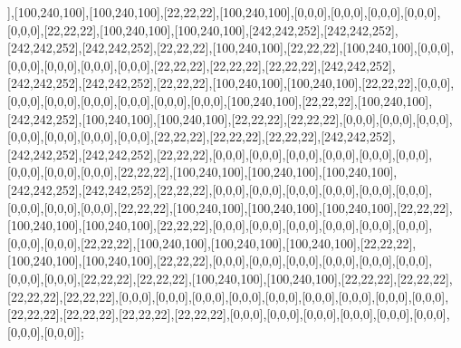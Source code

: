 ],[100,240,100],[100,240,100],[22,22,22],[100,240,100],[0,0,0],[0,0,0],[0,0,0],[0,0,0],[0,0,0],[22,22,22],[100,240,100],[100,240,100],[242,242,252],[242,242,252],[242,242,252],[242,242,252],[22,22,22],[100,240,100],[22,22,22],[100,240,100],[0,0,0],[0,0,0],[0,0,0],[0,0,0],[0,0,0],[22,22,22],[22,22,22],[22,22,22],[242,242,252],[242,242,252],[242,242,252],[22,22,22],[100,240,100],[100,240,100],[22,22,22],[0,0,0],[0,0,0],[0,0,0],[0,0,0],[0,0,0],[0,0,0],[0,0,0],[100,240,100],[22,22,22],[100,240,100],[242,242,252],[100,240,100],[100,240,100],[22,22,22],[22,22,22],[0,0,0],[0,0,0],[0,0,0],[0,0,0],[0,0,0],[0,0,0],[0,0,0],[22,22,22],[22,22,22],[22,22,22],[242,242,252],[242,242,252],[242,242,252],[22,22,22],[0,0,0],[0,0,0],[0,0,0],[0,0,0],[0,0,0],[0,0,0],[0,0,0],[0,0,0],[0,0,0],[22,22,22],[100,240,100],[100,240,100],[100,240,100],[242,242,252],[242,242,252],[22,22,22],[0,0,0],[0,0,0],[0,0,0],[0,0,0],[0,0,0],[0,0,0],[0,0,0],[0,0,0],[0,0,0],[22,22,22],[100,240,100],[100,240,100],[100,240,100],[22,22,22],[100,240,100],[100,240,100],[22,22,22],[0,0,0],[0,0,0],[0,0,0],[0,0,0],[0,0,0],[0,0,0],[0,0,0],[0,0,0],[22,22,22],[100,240,100],[100,240,100],[100,240,100],[22,22,22],[100,240,100],[100,240,100],[22,22,22],[0,0,0],[0,0,0],[0,0,0],[0,0,0],[0,0,0],[0,0,0],[0,0,0],[0,0,0],[22,22,22],[22,22,22],[100,240,100],[100,240,100],[22,22,22],[22,22,22],[22,22,22],[22,22,22],[0,0,0],[0,0,0],[0,0,0],[0,0,0],[0,0,0],[0,0,0],[0,0,0],[0,0,0],[0,0,0],[22,22,22],[22,22,22],[22,22,22],[22,22,22],[0,0,0],[0,0,0],[0,0,0],[0,0,0],[0,0,0],[0,0,0],[0,0,0],[0,0,0]];

